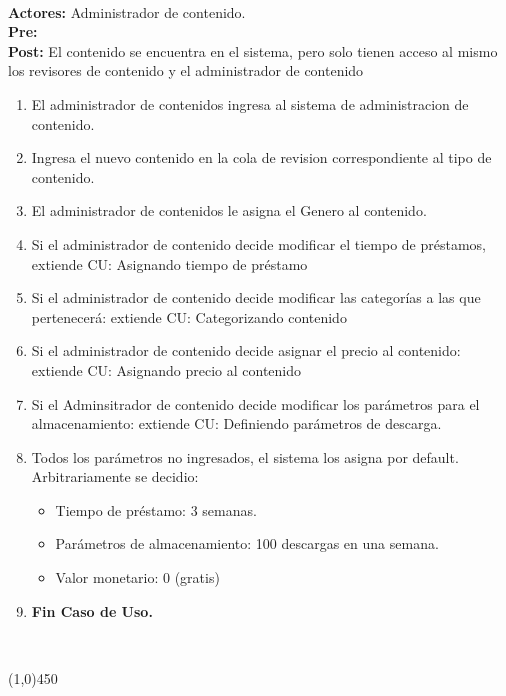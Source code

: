 \documentclass[11pt, a4paper, spanish]{article}
\begin{document}
{	 \\
\textbf{Actores:} Administrador de contenido. \\
\textbf{Pre:}  \\
\textbf{Post:} El contenido se encuentra en el sistema, pero solo tienen acceso al mismo los revisores de contenido y el administrador de contenido\\
\begin{enumerate}
	\item El administrador de contenidos ingresa al sistema de administracion de contenido.
\item Ingresa el nuevo contenido en la cola de revision correspondiente al tipo de contenido.
\item El administrador de contenidos le asigna el Genero al contenido.
\item Si el administrador de contenido decide modificar el tiempo de préstamos, extiende CU: Asignando tiempo de préstamo
\item Si el administrador de contenido decide modificar las categorías a las que pertenecerá: extiende CU: Categorizando contenido
\item Si el administrador de contenido decide asignar el precio al contenido: extiende CU: Asignando precio al contenido
\item Si el Adminsitrador de contenido decide modificar los parámetros para el almacenamiento: extiende CU: Definiendo parámetros de descarga.
\item Todos los parámetros no ingresados, el sistema los asigna por default. Arbitrariamente se decidio: 
\begin{itemize}
\item Tiempo de préstamo: 3 semanas.  
\item Parámetros de almacenamiento: 100 descargas en una semana.
\item Valor monetario: 0 (gratis)
\end{itemize}
\item \textbf{Fin Caso de Uso.} \\

\end{enumerate}
 \\
\begin{center} \line(1,0){450} \end{center}




}
\end{document}
